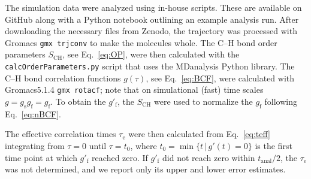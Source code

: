 \documentclass[journal=jpcbfk,manuscript=article,layout=twocolumn]{achemso}
\begin{document}
The simulation data were analyzed using in-house scripts. These are available on GitHub \cite{citehere} along with a Python notebook outlining an example analysis run.
After downloading the necessary files from Zenodo, the trajectory was processed with Gromacs \texttt{gmx trjconv} to make the molecules whole.
The C--H bond order parameters  $S_\mathrm{CH}$, see Eq.~\eqref{eq:OP}, were then calculated with the \texttt{calcOrderParameters.py}\cite{citegithubhere} script that uses the MDanalysis\cite{XXX} Python library.
%
The \mbox{C--H} bond correlation functions
$g(\tau)$, see Eq.~\eqref{eq:BCF},
were calculated with Gromacs5.1.4\cite{XXX} \texttt{gmx rotacf};
note that on simulational (fast) time scales $g = g_\mathrm{s} g_\mathrm{f}= g_\mathrm{f}$.
%
To obtain the $g'_\mathrm f$,
the $S_\mathrm{CH}$ were used to
normalize the $g_\mathrm f$ following Eq.~\eqref{eq:nBCF}.

The effective correlation times $\tau_\mathrm e$ were then calculated
from Eq.~\eqref{eq:teff} %
integrating from $\tau=0$ until $\tau = t_0$, where
$t_0 = \min
	\{
	t\,|\,g'(t)=0
	\}
        $
        is the first time point at which $g'_\mathrm f$ reached zero.
%
If $g'_\mathrm f$ did not reach zero within 
$t_\mathrm{anal}/2$, the 
$\tau_\mathrm e$ was not determined,
and we report only its upper and lower error estimates.
\end{document}
